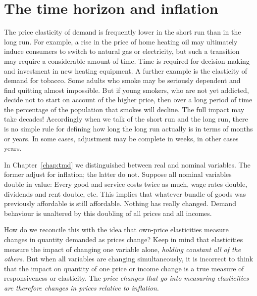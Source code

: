 \newpage
\section{The time horizon and inflation}\label{sec:ch4sec3}

The price elasticity of demand is frequently lower in the short run than in
the long run. For example, a rise in the price of home heating oil may
ultimately induce consumers to switch to natural gas or electricity, but
such a transition may require a considerable amount of time. Time is
required for decision-making and investment in new heating equipment. A
further example is the elasticity of demand for tobacco. Some adults who
smoke may be seriously dependent and find quitting almost impossible. But if
young smokers, who are not yet addicted, decide not to start on account of
the higher price, then over a long period of time the percentage of the
population that smokes will decline. The full impact may take decades!
Accordingly when we talk of the short run and the long run, there is no simple rule for
defining how long the long run actually is in terms of months or years. In
some cases, adjustment may be complete in weeks, in other cases years.

In Chapter~\ref{chap:tmd} we distinguished between real and nominal
variables. The former adjust for inflation; the latter do not. Suppose all
nominal variables double in value: Every good and service costs twice as
much, wage rates double, dividends and rent double, etc. This implies that
whatever bundle of goods was previously affordable is still affordable.
Nothing has really changed. Demand behaviour is unaltered by this doubling
of all prices and all incomes.

How do we reconcile this with the idea that own-price elasticities measure
changes in quantity demanded as prices change? Keep in mind that
elasticities measure the impact of changing one variable alone, \textit{%
holding constant all of the others}. But when all variables are changing
simultaneously, it is incorrect to think that the impact on quantity of one
price or income change is a true measure of responsiveness or elasticity.
The \textit{price changes that go into measuring elasticities are therefore
changes in prices relative to inflation}.